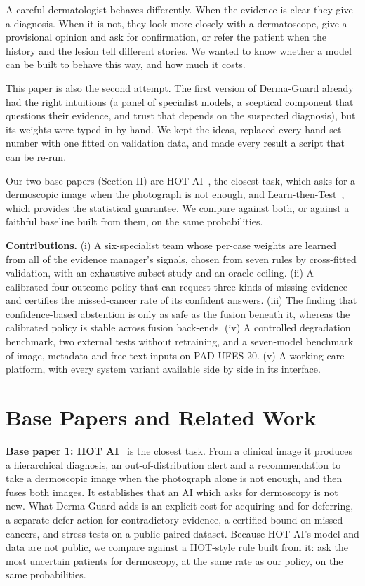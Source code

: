 \documentclass[conference]{IEEEtran}
\begin{document}
A careful dermatologist behaves differently. When the evidence is clear they give a diagnosis. When it is not, they look more closely with a dermatoscope, give a provisional opinion and ask for confirmation, or refer the patient when the history and the lesion tell different stories. We wanted to know whether a model can be built to behave this way, and how much it costs.

This paper is also the second attempt. The first version of Derma-Guard already had the right intuitions (a panel of specialist models, a sceptical component that questions their evidence, and trust that depends on the suspected diagnosis), but its weights were typed in by hand. We kept the ideas, replaced every hand-set number with one fitted on validation data, and made every result a script that can be re-run.

Our two base papers (Section II) are HOT AI~\cite{r2}, the closest task, which asks for a dermoscopic image when the photograph is not enough, and Learn-then-Test~\cite{r3}, which provides the statistical guarantee. We compare against both, or against a faithful baseline built from them, on the same probabilities.

\textbf{Contributions.} (i) A six-specialist team whose per-case weights are learned from all of the evidence manager's signals, chosen from seven rules by cross-fitted validation, with an exhaustive subset study and an oracle ceiling. (ii) A calibrated four-outcome policy that can request three kinds of missing evidence and certifies the missed-cancer rate of its confident answers. (iii) The finding that confidence-based abstention is only as safe as the fusion beneath it, whereas the calibrated policy is stable across fusion back-ends. (iv) A controlled degradation benchmark, two external tests without retraining, and a seven-model benchmark of image, metadata and free-text inputs on PAD-UFES-20. (v) A working care platform, with every system variant available side by side in its interface.

\section{Base Papers and Related Work}
\textbf{Base paper 1: HOT AI}~\cite{r2} is the closest task. From a clinical image it produces a hierarchical diagnosis, an out-of-distribution alert and a recommendation to take a dermoscopic image when the photograph alone is not enough, and then fuses both images. It establishes that an AI which asks for dermoscopy is not new. What Derma-Guard adds is an explicit cost for acquiring and for deferring, a separate defer action for contradictory evidence, a certified bound on missed cancers, and stress tests on a public paired dataset. Because HOT AI's model and data are not public, we compare against a HOT-style rule built from it: ask the most uncertain patients for dermoscopy, at the same rate as our policy, on the same probabilities.
\end{document}
